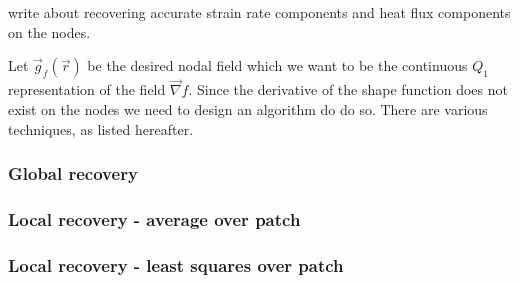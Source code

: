 
write about recovering accurate strain rate components and heat flux components on the nodes.

Let $\vec g_f(\vec r)$  be the desired nodal 
field which we want to be the continuous $Q_1$ representation of the field $\vec \nabla f$.
Since the derivative of the shape function does not exist on the nodes we need to design
an algorithm do do so. There are various techniques, as listed hereafter.


\subsubsection{Global recovery}




\subsubsection{Local recovery - average over patch}




\subsubsection{Local recovery - least squares over patch}

